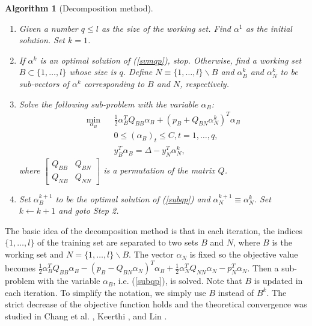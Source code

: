 \documentclass[11pt]{article}
\theoremstyle{break}
\newtheorem{algorithm1}[theorem]{Algorithm}
\begin{document}
\begin{algorithm1}[Decomposition method]
\label{decomp}
  \begin{enumerate}
  \item Given a number $q \leq l$ as
the size of the working set. 
Find $\alpha^1$ as the initial solution. 
Set $k = 1$.
\item 
If $\alpha^k$ is an optimal solution
of (\ref{svmqp}), stop. Otherwise,
find a working set $B 
\subset \{1, \ldots, l\}$ whose size
is $q$.
Define 
$N \equiv \{1, \ldots, l\} \backslash B$
and $\alpha^k_B$ and $\alpha^k_N$
to be sub-vectors of $\alpha^k$
corresponding to $B$ and $N$,
respectively.
\item Solve the following sub-problem
with the variable $\alpha_B$:
\begin{eqnarray}
 \min_{\alpha_B} && \frac{1}{2} \alpha_B^T Q_{BB} \alpha_B 
+ (p_B + Q_{BN} \alpha^k_N)^T \alpha_B \nonumber \\
&& 0 \leq (\alpha_B)_t \leq C,  
t = 1, \ldots, q, \label{subqp} \\
&& y_B^T \alpha_B = \Delta -y_N^T \alpha^k_N,   \nonumber 
\end{eqnarray}
where 
$\left[
\begin{smallmatrix}
 Q_{BB} & Q_{BN} \\
Q_{NB} & Q_{NN}
\end{smallmatrix}
\right]
$
is a permutation of the matrix $Q$.

\item 
Set $\alpha^{k+1}_B$
to be the optimal solution of (\ref{subqp}) 
and $\alpha^{k+1}_N
\equiv \alpha^k_N$.
Set $k 
\leftarrow k + 1$ and goto 
Step 2.
  \end{enumerate}
\end{algorithm1}
The basic idea of the
decomposition method 
is that in each iteration,
the indices $\{1, \ldots, l \}$ of the 
training set are separated to two
sets $B$ and $N$, where
$B$ is the working set
and $N 
= \{1, \ldots, l\} \backslash B$.
The vector $\alpha_N$ is fixed 
so the objective value becomes
$\frac{1}{2} \alpha_B^T Q_{BB} \alpha_B 
- (p_B - Q_{BN} \alpha_N)^T \alpha_B 
+ \frac{1}{2} \alpha_N^T Q_{NN} \alpha_N - 
p_N^T \alpha_N$. 
Then a sub-problem 
with the variable $\alpha_B$,
i.e. (\ref{subqp}),
is solved.
Note that $B$ is updated in each
iteration. To simplify the notation,
we simply use $B$ instead of $B^k$.
The strict decrease of the objective
function holds and the
theoretical convergence was studied
in Chang et al. \citeyear{CC00b},
Keerthi \citeyear{SSK00a},
and Lin \citeyear{CJL00b}.
\end{document}
